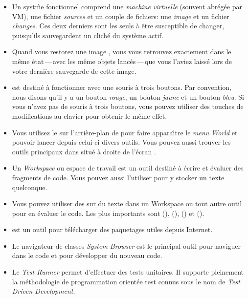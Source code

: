 \documentclass[a4paper,10pt,twoside]{book}
\begin{document}
\begin{itemize}
  \item Un syst\`me \sq fonctionnel comprend une \emph{machine
      virtuelle} (souvent abr\'eg\'ee par VM), une fichier
    \emph{sources} et un couple de fichiers: une \emph{image} et un
    fichier \emph{changes}. Ces deux derniers sont les seuls \`a
    \^etre susceptible de changer, puisqu'ils sauvegardent un clich\'e
    du syst\`eme actif.
  \item Quand vous restorez une image \sq, vous vous retrouvez
    exactement dans le m\^eme \'etat\,---\,avec les m\^eme objets
    lanc\'es\,---\,que vous l'aviez laiss\'e lors de votre derni\`ere
    sauvegarde de cette image.
  \item \sq est destin\'e \`a fonctionner avec une souris \`a trois
    boutons. Par convention, nous disons qu'il y a un bouton \emph{rouge}, un bouton
    \emph{jaune} et un bouton \emph{bleu}. Si vous n'avez pas de
    souris \`a trois boutons, vous pouvez utiliser des touches de
    modifications au clavier pour obtenir le m\^eme effet.
  \item Vous utilisez le  sur l'arri\`ere-plan de
    \sq pour faire appara\^{\i}tre le \emph{menu World} et pouvoir
    lancer depuis celui-ci divers outils. Vous pouvez aussi trouver
    les outils principaux dans \toolsflapind situ\'e \`a droite de
    l'\'ecran \sq.
  \item Un \emph{Workspace} ou espace de travail est un outil
    destin\'e \`a \'ecrire et \'evaluer des fragments de code. Vous
    pouvez aussi l'utiliser pour y stocker un texte quelconque.
  \item Vous pouvez utiliser des  sur du texte
    dans un Workspace ou tout autre outil pour en
    \'evaluer le code. Les plus importants sont  (),  (),  () et  ().
  \item \sqmap est un outil pour t\'el\'echarger des paquetages utiles
    depuis Internet.
  \item Le navigateur de classes \emph{System Browser} est le
    principal outil pour naviguer dans le code \sq et pour
    d\'evelopper du nouveau code.
  \item Le \emph{Test Runner} permet d'effectuer des tests
    unitaires. Il supporte pleinement la m\'ethodologie de
    programmation orient\'ee test connus sous le nom de \emph{Test
      Driven Development}.
\end{itemize}

\ifx\wholebook\relax\else 
   
   
\end{document}
